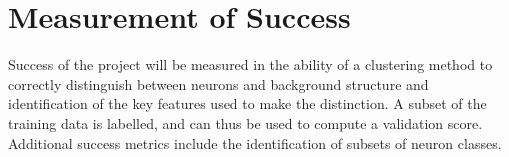 \documentclass[11pt]{article}
\begin{document}
\section{Measurement of Success}

Success of the project will be measured in the ability of a clustering method to correctly distinguish between neurons and background structure and identification of the key features used to make the distinction.
A subset of the training data is labelled, and can thus be used to compute a validation score.
Additional success metrics include the identification of subsets of neuron classes.


\printbibliography
\end{document}
